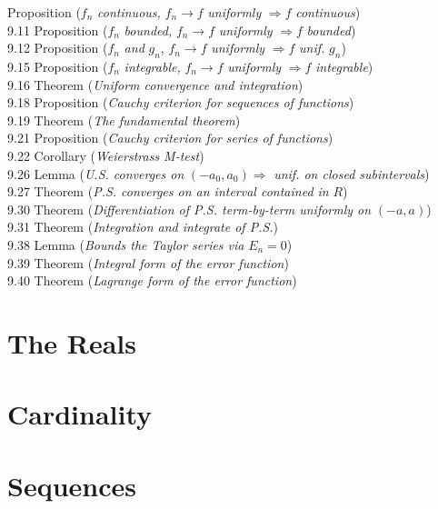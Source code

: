 \documentclass[12pt]{article}
\begin{document}
\vspace{0.5em}

 Proposition ($f_n$ \emph{continuous,} $f_n \to f$ \emph{uniformly} $\Rightarrow f$ \emph{continuous})  \\
9.11 Proposition ($f_n$ \emph{bounded,} $f_n \to f$ \emph{uniformly} $\Rightarrow f$ \emph{bounded})  \\
9.12 Proposition ($f_n$ \emph{and} $g_n$, $f_n \to f$ \emph{uniformly} $\Rightarrow f$ \emph{unif.} $g_n$)  \\
9.15 Proposition ($f_n$ \emph{integrable,} $f_n \to f$ \emph{uniformly} $\Rightarrow f$ \emph{integrable})  \\
9.16 Theorem (\emph{Uniform convergence and integration})  \\
9.18 Proposition (\emph{Cauchy criterion for sequences of functions})  \\
9.19 Theorem (\emph{The fundamental theorem})  \\
9.21 Proposition (\emph{Cauchy criterion for series of functions})  \\
9.22 Corollary (\emph{Weierstrass M-test})  \\
9.26 Lemma (\emph{U.S. converges on} $(-a_0, a_0) \Rightarrow$ \emph{unif. on closed subintervals})  \\
9.27 Theorem (\emph{P.S. converges on an interval contained in} $R$)  \\
9.30 Theorem (\emph{Differentiation of P.S. term-by-term uniformly on} $(-a, a)$)  \\
9.31 Theorem (\emph{Integration and integrate of P.S.})  \\
9.38 Lemma (\emph{Bounds the Taylor series via} $E_n = 0$)  \\
9.39 Theorem (\emph{Integral form of the error function})  \\
9.40 Theorem (\emph{Lagrange form of the error function})  \\
\newpage
\section{The Reals}
\newpage
\section{Cardinality}
\newpage
\section{Sequences}
\newpage
\end{document}
